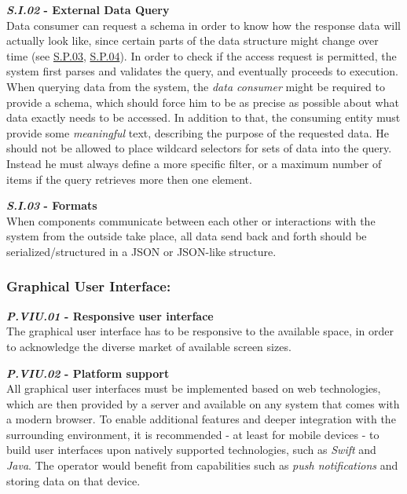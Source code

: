 \documentclass[12pt,english,a4paper,titlepage,cleardoublepage=empty,dottedtoc]{report}
\begin{document}
\textbf{\emph{\protect\hypertarget{si02}{}{S.I.02}} - External Data
Query}\\
Data consumer can request a schema in order to know how the response
data will actually look like, since certain parts of the data structure
might change over time (see \protect\hyperlink{sp03}{S.P.03},
\protect\hyperlink{sp04}{S.P.04}). In order to check if the access
request is permitted, the system first parses and validates the query,
and eventually proceeds to execution. When querying data from the
system, the \emph{data consumer} might be required to provide a schema,
which should force him to be as precise as possible about what data
exactly needs to be accessed. In addition to that, the consuming entity
must provide some \emph{meaningful} text, describing the purpose of the
requested data. He should not be allowed to place wildcard selectors for
sets of data into the query. Instead he must always define a more
specific filter, or a maximum number of items if the query retrieves
more then one element.

\textbf{\emph{\protect\hypertarget{si03}{}{S.I.03}} - Formats}\\
When components communicate between each other or interactions with the
system from the outside take place, all data send back and forth should
be serialized/structured in a JSON or JSON-like structure.

\subsubsection*{Graphical User
Interface:}\label{graphical-user-interface}

\textbf{\emph{\protect\hypertarget{pviu01}{}{P.VIU.01}} - Responsive
user interface}\\
The graphical user interface has to be responsive to the available
space, in order to acknowledge the diverse market of available screen
sizes.

\textbf{\emph{\protect\hypertarget{pviu02}{}{P.VIU.02}} - Platform
support}\\
All graphical user interfaces must be implemented based on web
technologies, which are then provided by a server and available on any
system that comes with a modern browser. To enable additional features
and deeper integration with the surrounding environment, it is
recommended - at least for mobile devices - to build user interfaces
upon natively supported technologies, such as \emph{Swift} and
\emph{Java}. The operator would benefit from capabilities such as
\emph{push notifications} and storing data on that device.
\end{document}
